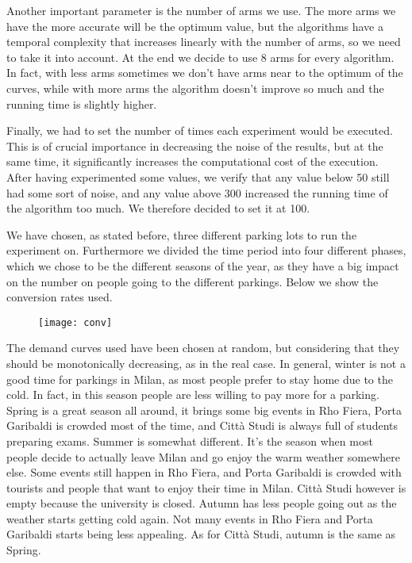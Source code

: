Another important parameter is the number of arms we use. The more arms we have the more accurate will be the optimum value,
but the algorithms have a temporal complexity that increases linearly with the number of arms, so we need to take it into account.
At the end we decide to use 8 arms for every algorithm. In fact, with less arms sometimes we don't have arms near to the optimum
of the curves, while with more arms the algorithm doesn't improve so much and the running time is slightly higher.

Finally, we had to set the number of times each experiment would be executed.
This is of crucial importance in decreasing the noise of the results, but at the same time, it significantly increases
the computational cost of the execution. After having experimented some values, we verify that any value below 50 still had some
sort of noise, and any value above 300 increased the running time of the algorithm too much.
We therefore decided to set it at 100.

We have chosen, as stated before, three different parking lots to run the experiment on.
Furthermore we divided the time period into four different phases, which we chose to be the different seasons of the year,
as they have a big impact on the number on people going to the different parkings.
Below we show the conversion rates used.
\begin{figure}[H]
	\texttt{[image: conv]}
\end{figure}

The demand curves used have been chosen at random, but considering that they should be monotonically decreasing, as in the real case.
In general, winter is not a good time for parkings in Milan, as most people prefer to stay home due to the cold. In fact, in this season
people are less willing to pay more for a parking.
Spring is a great season all around, it brings some big events in Rho Fiera, Porta Garibaldi is crowded most of the time,
and Città Studi is always full of students preparing exams.
Summer is somewhat different. It's the season when most people decide to actually leave Milan and go enjoy the warm weather
somewhere else.
Some events still happen in Rho Fiera, and Porta Garibaldi is crowded with tourists and people that want to enjoy their
time in Milan. Città Studi however is empty because the university is closed.
Autumn has less people going out as the weather starts getting cold again.
Not many events in Rho Fiera and Porta Garibaldi starts being less appealing. As for Città Studi, autumn is the same as Spring.




